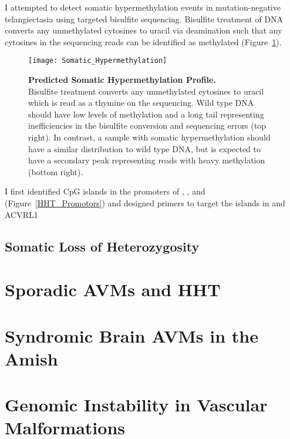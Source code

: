 I attempted to detect somatic hypermethylation events in mutation-negative telangiectasia using targeted bisulfite sequencing. Bisulfite treatment of DNA converts any unmethylated cytosines to uracil via deamination such that any cytosines in the sequencing reads can be identified as methylated (Figure~\ref{Somatic_Hypermethylation}). 
\begin{figure}[tbp!]
\begin{center}
\texttt{[image: Somatic\_Hypermethylation]}
\end{center}
\caption[Predicted Somatic Hypermethylation Profile]{\textbf{Predicted Somatic Hypermethylation Profile.} \\ Bisulfite treatment converts any unmethylated cytosines to uracil which is read as a thymine on the sequencing. Wild type DNA should have low levels of methylation and a long tail representing inefficiencies in the bisulfite conversion and sequencing errors (top right). In contrast, a sample with somatic hypermethylation should have a similar distribution to wild type DNA, but is expected to have a secondary peak representing reads with heavy methylation (bottom right).}
\label{Somatic_Hypermethylation}
\end{figure}
I first identified CpG islands in the promoters of , , and  (Figure~\ref{HHT_Promotors}) and designed primers to target the islands in  and ACVRL1

\subsection{Somatic Loss of Heterozygosity}



\section{Sporadic AVMs and HHT}



\section{Syndromic Brain AVMs in the Amish}




\section{Genomic Instability in Vascular Malformations}



